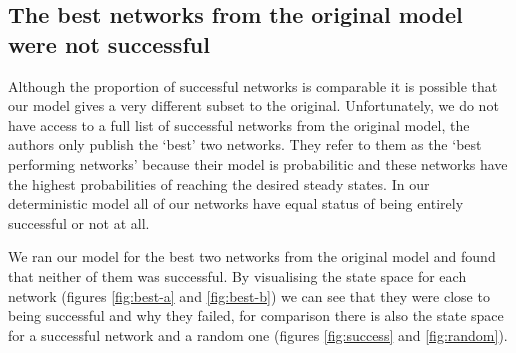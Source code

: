 \documentclass[a4paper,11pt]{article}
\begin{document}
\subsection{The best networks from the original model were not successful}
Although the proportion of successful networks is comparable it is possible that our model gives a very different subset to the original. Unfortunately, we do not have access to a full list of successful networks from the original model, the authors only publish the `best' two networks. They refer to them as the `best performing networks' because their model is probabilitic and these networks have the highest probabilities of reaching the desired steady states. In our deterministic model all of our networks have equal status of being entirely successful or not at all.\par

We ran our model for the best two networks from the original model and found that neither of them was successful. By visualising the state space for each network (figures \ref{fig:best-a} and \ref{fig:best-b}) we can see that they were close to being successful and why they failed, for comparison there is also the state space for a successful network and a random one (figures \ref{fig:success} and \ref{fig:random}).\par
\end{document}
